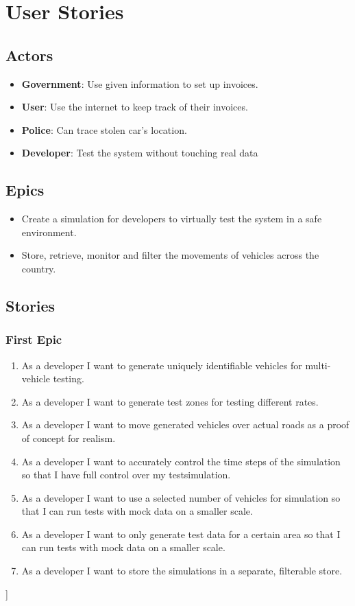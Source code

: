 \chapter{User Stories}
\section{Actors}
\begin{itemize}
\item{\textbf{Government}: Use given information to set up invoices.}
\item{\textbf{User}: Use the internet to keep track of their invoices.}
\item{\textbf{Police}: Can trace stolen car's location.}
\item{\textbf{Developer}: Test the system without touching real data}
\end{itemize}

\section{Epics}
\begin{itemize}
 \item Create a simulation for developers to virtually test the system in a safe environment.
 \item Store, retrieve, monitor and filter the movements of vehicles across the country.
\end{itemize}

\section{Stories}
\subsection{First Epic}
\begin{enumerate}
	\item As a developer I want to generate uniquely identifiable vehicles for multi-vehicle testing.
	\item As a developer I want to generate test zones for testing different rates.
	\item As a developer I want to move generated vehicles over actual roads as a proof of concept for realism.
	\item As a developer I want to accurately control the time steps of the simulation so that I have full control over my testsimulation.
	\item As a developer I want to use a selected number of vehicles for simulation so that I can run tests with mock data on a smaller scale.
	\item As a developer I want to only generate test data for a certain area so that I can run tests with mock data on a smaller scale.
	\item As a developer I want to store the simulations in a separate, filterable store.
\end{enumerate}]

